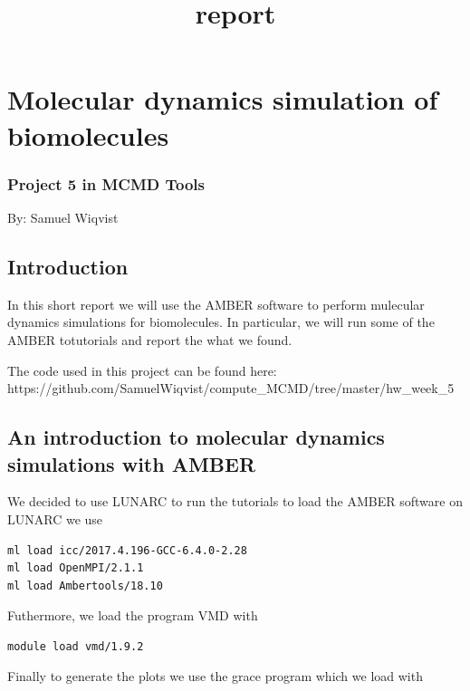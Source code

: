 \documentclass[11pt]{article}
\title{report}
\begin{document}
    
    
    \maketitle
    
    

    
    \section{Molecular dynamics simulation of
biomolecules}\label{molecular-dynamics-simulation-of-biomolecules}

\subsubsection{Project 5 in MCMD Tools}\label{project-5-in-mcmd-tools}

By: Samuel Wiqvist

    \subsection{Introduction}\label{introduction}

In this short report we will use the AMBER software to perform mulecular
dynamics simulations for biomolecules. In particular, we will run some
of the AMBER totutorials and report the what we found.

The code used in this project can be found here:
https://github.com/SamuelWiqvist/compute\_MCMD/tree/master/hw\_week\_5

    \subsection{An introduction to molecular dynamics simulations with
AMBER}\label{an-introduction-to-molecular-dynamics-simulations-with-amber}

We decided to use LUNARC to run the tutorials to load the AMBER software
on LUNARC we use

\begin{verbatim}
ml load icc/2017.4.196-GCC-6.4.0-2.28
ml load OpenMPI/2.1.1
ml load Ambertools/18.10
\end{verbatim}

Futhermore, we load the program VMD with

\begin{verbatim}
module load vmd/1.9.2
\end{verbatim}

Finally to generate the plots we use the grace program which we load
with
\end{document}
